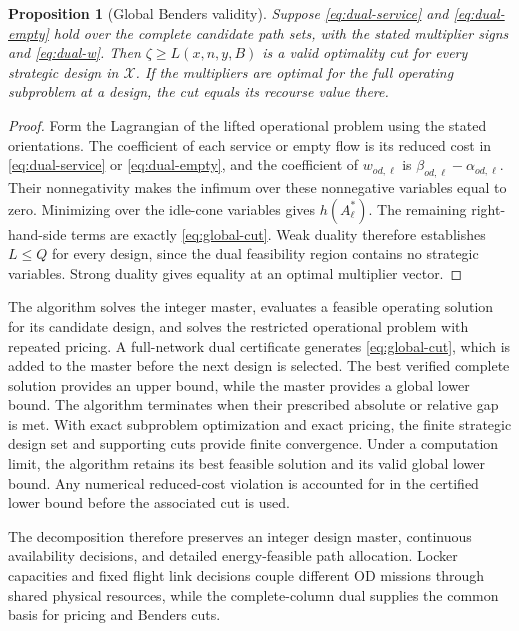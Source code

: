 \documentclass[final,3p,authoryear]{elsarticle}
\newtheorem{proposition}{Proposition}
\begin{document}
\begin{proposition}[Global Benders validity]
\label{prop:cut-validity}
Suppose \eqref{eq:dual-service} and \eqref{eq:dual-empty} hold over the complete candidate path sets, with the stated multiplier signs and \eqref{eq:dual-w}.
Then $\zeta\ge L(x,n,y,B)$ is a valid optimality cut for every strategic design in $\mathcal X$.
If the multipliers are optimal for the full operating subproblem at a design, the cut equals its recourse value there.
\end{proposition}
\begin{proof}
Form the Lagrangian of the lifted operational problem using the stated orientations.
The coefficient of each service or empty flow is its reduced cost in \eqref{eq:dual-service} or \eqref{eq:dual-empty}, and the coefficient of $w_{od,\ell}$ is $\beta_{od,\ell}-\alpha_{od,\ell}$.
Their nonnegativity makes the infimum over these nonnegative variables equal to zero.
Minimizing over the idle-cone variables gives $h(A_\ell^*)$.
The remaining right-hand-side terms are exactly \eqref{eq:global-cut}.
Weak duality therefore establishes $L\le Q$ for every design, since the dual feasibility region contains no strategic variables.
Strong duality gives equality at an optimal multiplier vector.
\end{proof}

The algorithm solves the integer master, evaluates a feasible operating solution for its candidate design, and solves the restricted operational problem with repeated pricing.
A full-network dual certificate generates \eqref{eq:global-cut}, which is added to the master before the next design is selected.
The best verified complete solution provides an upper bound, while the master provides a global lower bound.
The algorithm terminates when their prescribed absolute or relative gap is met.
With exact subproblem optimization and exact pricing, the finite strategic design set and supporting cuts provide finite convergence.
Under a computation limit, the algorithm retains its best feasible solution and its valid global lower bound.
Any numerical reduced-cost violation is accounted for in the certified lower bound before the associated cut is used.

The decomposition therefore preserves an integer design master, continuous availability decisions, and detailed energy-feasible path allocation.
Locker capacities and fixed flight link decisions couple different OD missions through shared physical resources, while the complete-column dual supplies the common basis for pricing and Benders cuts.
\end{document}

